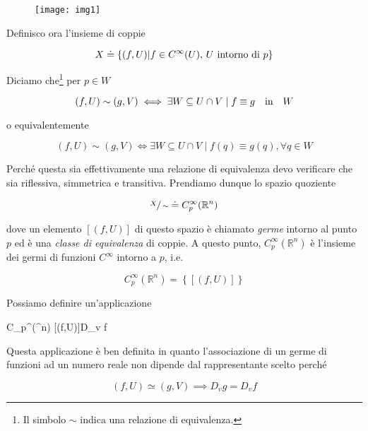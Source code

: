 \begin{figure}[H]
	\centering
	\texttt{[image: img1]}
\end{figure}

Definisco ora l'insieme di coppie

\begin{equation}
	X \doteq \left\{ (f,U) \middle| f \in C^{\infty}(U), \, \text{$ U $ intorno di $ p $} \right\}
\end{equation}

Diciamo che\footnote{%
	Il simbolo $ \sim $ indica una relazione di equivalenza.%
} per $ p \in W $

\begin{equation}
	(f,U) \sim (g,V) \iff \exists W \subseteq U \cap V \mid f \equiv g \qq{in} W
\end{equation}

o equivalentemente

\begin{equation}
	(f,U) \sim (g,V) \iff \exists W \subseteq U \cap V \mid f(q) \equiv g(q), \forall q \in W
\end{equation}

Perché questa sia effettivamente una relazione di equivalenza devo verificare che sia riflessiva, simmetrica e transitiva. Prendiamo dunque lo spazio quoziente

\begin{equation}
	\sfrac{X}{\sim} \doteq C_{p}^{\infty}(\mathbb{R}^{n})
\end{equation}

dove un elemento $ [(f,U)] $ di questo spazio è chiamato \textit{germe} intorno al punto $ p $ ed è una \textit{classe di equivalenza} di coppie. A questo punto, $ C_{p}^{\infty}(\mathbb{R}^{n}) $ è l'insieme dei germi di funzioni $ C^{\infty} $ intorno a $ p $, i.e.

\begin{equation}
	C_{p}^{\infty}(\mathbb{R}^{n}) = \left\{ [(f,U)] \right\}
\end{equation} 

Possiamo definire un'applicazione

%
	{C_{p}^{\infty}(\R^{n})}{\R}%
	{[(f,U)]}{D_{v} f}

Questa applicazione è ben definita in quanto l'associazione di un germe di funzioni ad un numero reale non dipende dal rappresentante scelto perché

\begin{equation}
	(f,U) \simeq (g,V) \implies D_{v} g = D_{v} f
\end{equation}

